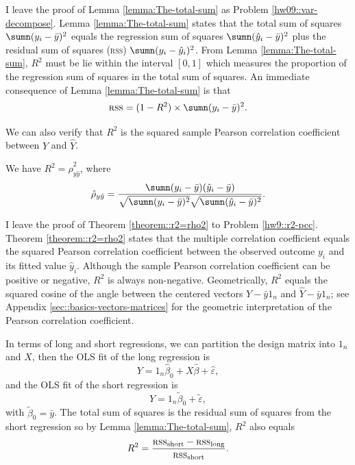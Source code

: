 I leave the proof of Lemma \ref{lemma:The-total-sum} as Problem \ref{hw09::var-decompose}. 
Lemma \ref{lemma:The-total-sum} states that the total sum of squares $\sumn(y_{i}-\bar{y})^{2}$
equals  the regression sum of squares $\sumn(\hat{y}_{i}-\bar{y})^{2}$
plus the residual sum of squares (\textsc{rss}) $\sumn(y_{i}-\hat{y}_{i})^{2}$. 
From Lemma
\ref{lemma:The-total-sum}, $R^{2}$ must be lie within the interval
$[0,1]$ which measures the proportion of the regression sum of squares
in the total sum of squares. An immediate consequence of Lemma \ref{lemma:The-total-sum} is that
$$
\textsc{rss} = (1-R^2)\times  \sumn(y_{i}-\bar{y})^{2}.
$$

We can also verify that $R^{2}$ is the squared sample Pearson correlation
coefficient between $Y$ and $\hat{Y}$. 
\begin{theorem}\label{theorem::r2=rho2}
We have $R^{2}= \hat{\rho}_{y\hat{y}}^2$, where
\begin{equation}
\hat{\rho}_{y\hat{y}}
= \frac{\sumn(y_{i}-\bar{y})(\hat{y}_{i}-\bar{y})}{\sqrt{\sumn(y_{i}-\bar{y})^{2}}\sqrt{\sumn(\hat{y}_{i}-\bar{y})^{2}}} .
\label{eq:r2PCC}
\end{equation}
\end{theorem}

I leave the proof of Theorem \ref{theorem::r2=rho2} to Problem \ref{hw9::r2-pcc}.  Theorem \ref{theorem::r2=rho2} states that the multiple correlation coefficient equals the squared Pearson correlation coefficient between the observed outcome $y_i$ and its fitted value $\hat{y}_i$. 
Although the sample Pearson correlation coefficient can be positive or negative, $R^2$ is always non-negative.  
Geometrically, $R^2$ equals the squared cosine of the angle between the centered vectors $Y-\bar{y} 1_n$ and $\hat{Y} - \bar{y} 1_n$; see Appendix \ref{sec::basics-vectors-matrices} for the geometric interpretation of the Pearson correlation coefficient. 


 

In terms of long and short regressions, we can partition the design matrix into   $ 1_{n}$ and $X$, then the OLS fit of the long regression is
\begin{equation}
Y=1_{n}\hat{\beta}_0+X \hat{\beta} +\hat{\varepsilon},\label{eq:longregR2}
\end{equation}
 and the OLS fit of the short regression is
\begin{equation}
Y=1_{n}\tilde{\beta}_0 +\tilde{\varepsilon},\label{eq:shortregR2}
\end{equation}
with $\tilde{\beta}_0 =\bar{y}$.
The total sum of squares is the residual sum of squares from the short
regression so by Lemma \ref{lemma:The-total-sum}, $R^{2}$ also equals 
\begin{equation}
R^{2}  =  \frac{\textsc{rss}_{\text{short}}-\textsc{rss}_{\text{long}}}{\textsc{rss}_{\text{short}}} . \label{eq::residuals-R2} 
\end{equation}





